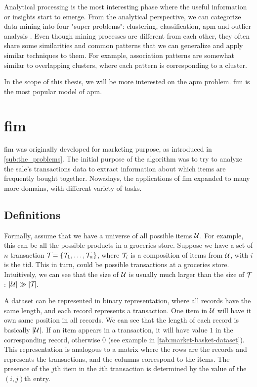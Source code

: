 Analytical processing is the most interesting phase where the useful information or insights start to emerge.
From the analytical perspective, we can categorize data mining into four "super problems": clustering, classification, \ac{apm} and outlier analysis \citep{Aggarwal15}.
Even though mining processes are different from each other, they often share some similarities and common patterns that we can generalize and apply similar techniques to them.
For example, association patterns are somewhat similar to overlapping clusters, where each pattern is corresponding to a cluster.

In the scope of this thesis, we will be more interested on the \acl{apm} problem.
\Acl{fim} \citep{borgelt_fim_2012} is the most popular model of \acl{apm}.


\section{\Acl{fim}}
\label{sec:fim}
\Acl{fim} was originally developed for marketing purpose, as introduced in \autoref{sub:the_problems}.
The initial purpose of the algorithm was to try to analyze the sale's transactions data to extract information about which items are frequently bought together.
Nowadays, the applications of \acl{fim} expanded to many more domains, with different variety of tasks.

\subsection{Definitions}
Formally, assume that we have a universe of all possible items $\mathcal{U}$.
For example, this can be all the possible products in a groceries store.
Suppose we have a set of $\mathit{n}$ transaction $\mathcal{T}_{} = \{\mathcal{T}_{1}, \dots, \mathcal{T}_{n}\}{}$, where $\mathcal{T}_{i}$ is a composition of items from $\mathcal{U}$, with $i$ is the \ac{tid}.
This in turn, could be possible transactions at a groceries store.
Intuitively, we can see that the size of $\mathcal{U}$ is usually much larger than the size of $\mathcal{T}_{}$: $|\mathcal{U}| \gg |\mathcal{T}_{} |$.

A dataset can be represented in binary representation, where all records have the same length, and each record represents a transaction.
One item in $\mathcal{U}$ will have it own same position in all records.
We can see that the length of each record is basically $|\mathcal{U}|$.
If an item appears in a transaction, it will have value $1$ in the corresponding record, otherwise $0$ (see example in \autoref{tab:market-basket-dataset}).
This representation is analogous to a matrix where the rows are the records and represents the transactions, and the columns correspond to the items.
The presence of the $\mathit{j}$th item in the $\mathit{i}$th transaction is determined by the value of the $\mathit{(i, j)}$th entry.

